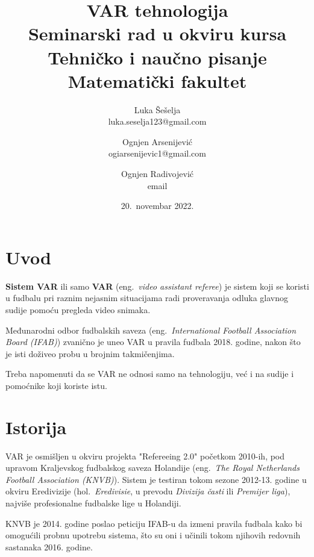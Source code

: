 \documentclass[a4paper]{article}
\begin{document}
\title{VAR tehnologija\\ \small{Seminarski rad u okviru kursa\\Tehničko i naučno pisanje\\ Matematički fakultet}}

\author{Luka Šešelja\\ luka.seselja123@gmail.com \and Ognjen Arsenijević\\ ogiarsenijevic1@gmail.com \and Ognjen Radivojević\\ email}
\date{20.~novembar 2022.}
\maketitle

\begin{abstract}
    
\end{abstract}

\tableofcontents

\newpage

\section{Uvod}
\textbf{Sistem VAR} ili samo \textbf{VAR} (eng.~{\em video assistant referee}) je sistem koji se koristi u fudbalu pri raznim nejasnim situacijama radi proveravanja odluka glavnog sudije pomoću pregleda video snimaka.

Međunarodni odbor fudbalskih saveza (eng.~{\em International Football Association Board (IFAB)}) zvanično je uneo VAR u pravila fudbala 2018. godine, nakon što je isti doživeo probu u brojnim takmičenjima.

Treba napomenuti da se VAR ne odnosi samo na tehnologiju, već i na sudije i pomoćnike koji koriste istu.

\section{Istorija}
VAR je osmišljen u okviru projekta "Refereeing 2.0" početkom 2010-ih, pod upravom Kraljevskog fudbalskog saveza Holandije (eng.~{\em The Royal Netherlands Football Association (KNVB)}). Sistem je testiran tokom sezone 2012-13. godine u okviru Eredivizije (hol.~{\emph{Eredivisie}, u prevodu \emph{Divizija časti} ili \emph{Premijer liga}}), najviše profesionalne fudbalske lige u Holandiji. 

KNVB je 2014. godine poslao peticiju IFAB-u da izmeni pravila fudbala kako bi omogućili probnu upotrebu sistema, što su oni i učinili tokom njihovih redovnih sastanaka 2016. godine.
\end{document}
